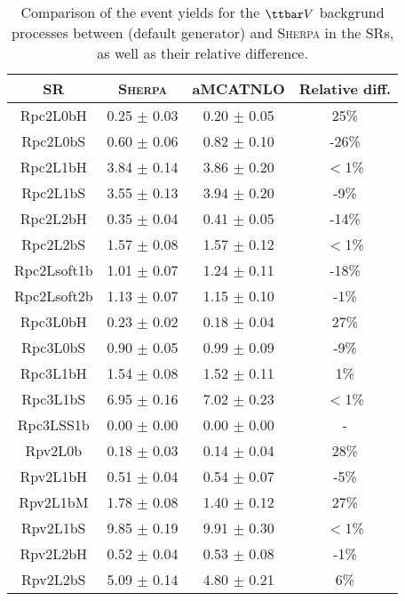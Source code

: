 \begin{table}[!htb]
\caption{Comparison of the event yields for the $\ttbar V$ backgrund processes between \AMCATNLO (default generator) and \textsc{Sherpa} in the SRs, as well as their relative difference.
}
\label{tab:ttVGenComp}
\def\arraystretch{1.1}
\centering
\begin{tabular}{|c|c|c|c|}
\hline\hline
   SR    & \textsc{Sherpa} & aMCATNLO & Relative diff.\\ \hline
Rpc2L0bH   &   0.25 $\pm$ 0.03   &   0.20 $\pm$ 0.05   &   25\% \\
Rpc2L0bS   &   0.60 $\pm$ 0.06   &   0.82 $\pm$ 0.10   &   -26\% \\
Rpc2L1bH   &   3.84 $\pm$ 0.14   &   3.86 $\pm$ 0.20   &   $<$1\% \\
Rpc2L1bS   &   3.55 $\pm$ 0.13   &   3.94 $\pm$ 0.20   &   -9\% \\
Rpc2L2bH   &   0.35 $\pm$ 0.04   &   0.41 $\pm$ 0.05   &   -14\% \\
Rpc2L2bS   &   1.57 $\pm$ 0.08   &   1.57 $\pm$ 0.12   &   $<$1\% \\
Rpc2Lsoft1b   &   1.01 $\pm$ 0.07   &   1.24 $\pm$ 0.11   &   -18\% \\
Rpc2Lsoft2b   &   1.13 $\pm$ 0.07   &   1.15 $\pm$ 0.10   &   -1\% \\
Rpc3L0bH   &   0.23 $\pm$ 0.02   &   0.18 $\pm$ 0.04   &   27\% \\
Rpc3L0bS   &   0.90 $\pm$ 0.05   &   0.99 $\pm$ 0.09   &   -9\% \\
Rpc3L1bH   &   1.54 $\pm$ 0.08   &   1.52 $\pm$ 0.11   &   1\% \\
Rpc3L1bS   &   6.95 $\pm$ 0.16   &   7.02 $\pm$ 0.23   &   $<$1\% \\
Rpc3LSS1b   &   0.00 $\pm$ 0.00   &   0.00 $\pm$ 0.00   &   - \\
Rpv2L0b   &   0.18 $\pm$ 0.03   &   0.14 $\pm$ 0.04   &   28\% \\
Rpv2L1bH   &   0.51 $\pm$ 0.04   &   0.54 $\pm$ 0.07   &   -5\% \\
Rpv2L1bM   &   1.78 $\pm$ 0.08   &   1.40 $\pm$ 0.12   &   27\% \\
Rpv2L1bS   &   9.85 $\pm$ 0.19   &   9.91 $\pm$ 0.30   &   $<$1\% \\
Rpv2L2bH   &   0.52 $\pm$ 0.04   &   0.53 $\pm$ 0.08   &   -1\% \\
Rpv2L2bS   &   5.09 $\pm$ 0.14   &   4.80 $\pm$ 0.21   &   6\%  \\
\hline\hline
\end{tabular}
\end{table}

